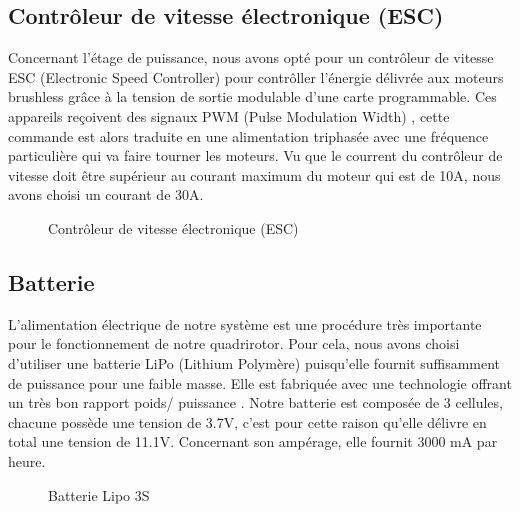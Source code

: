\subsection{Contrôleur de vitesse électronique (ESC)}
Concernant l'étage de puissance, nous avons opté pour un contrôleur de vitesse ESC (Electronic Speed Controller) pour contrôller l'énergie délivrée aux moteurs brushless  grâce à la tension de sortie modulable d’une carte programmable. Ces appareils reçoivent des signaux PWM (Pulse Modulation Width) \cite{altidrone}, cette commande est alors traduite en une alimentation triphasée avec une fréquence particulière qui va faire tourner les moteurs. Vu que le courrent du contrôleur de vitesse doit être supérieur au courant maximum du moteur qui est de 10A, nous avons choisi un courant de 30A. 
\begin{figure} [H]
	\begin{center}
		\centering
	\end{center}
	\caption{Contrôleur de vitesse électronique (ESC)}
\end{figure}

\subsection{Batterie}
L'alimentation électrique de notre système est une procédure très importante pour le fonctionnement de notre quadrirotor. Pour cela, nous avons choisi d'utiliser une batterie LiPo (Lithium Polymère) puisqu'elle fournit suffisamment de puissance pour une faible masse. Elle est fabriquée avec une technologie offrant un très bon rapport poids/ puissance \cite{encyclopedie}. Notre batterie est composée de 3 cellules, chacune possède une tension de 3.7V, c'est pour cette raison qu'elle délivre en total une tension de 11.1V. Concernant son ampérage, elle fournit 3000 mA par heure.
\par
\begin{figure} [H]
	\begin{center}
		\centering
	\end{center}
	\caption{Batterie Lipo 3S}
\end{figure}
